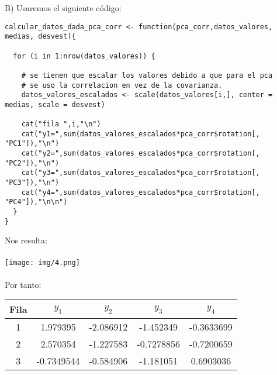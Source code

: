 \begin{sol}
\pagebreak

B) Usaremos el siguiente código: 
\begin{verbatim}
calcular_datos_dada_pca_corr <- function(pca_corr,datos_valores, medias, desvest){

  for (i in 1:nrow(datos_valores)) {

    # se tienen que escalar los valores debido a que para el pca
    # se uso la correlacion en vez de la covarianza.
    datos_valores_escalados <- scale(datos_valores[i,], center = medias, scale = desvest)

    cat("fila ",i,"\n")
    cat("y1=",sum(datos_valores_escalados*pca_corr$rotation[, "PC1"]),"\n")
    cat("y2=",sum(datos_valores_escalados*pca_corr$rotation[, "PC2"]),"\n")
    cat("y3=",sum(datos_valores_escalados*pca_corr$rotation[, "PC3"]),"\n")
    cat("y4=",sum(datos_valores_escalados*pca_corr$rotation[, "PC4"]),"\n\n")
  }
}
\end{verbatim}
Nos resulta:\\\\
\texttt{[image: img/4.png]}\\\\

Por tanto: 
\begin{table}[ht]
\centering
\begin{tabular}{|c|c|c|c|c|}
\hline
\textbf{Fila} & $y_1$ & $y_2$ & $y_3$ & $y_4$ \\
\hline
1 & 1.979395 & -2.086912 & -1.452349 & -0.3633699 \\
2 & 2.570354 & -1.227583 & -0.7278856 & -0.7200659 \\
3 & -0.7349544 & -0.584906 & -1.181051 & 0.6903036 \\
\hline
\end{tabular}
\end{table}

\end{sol}
